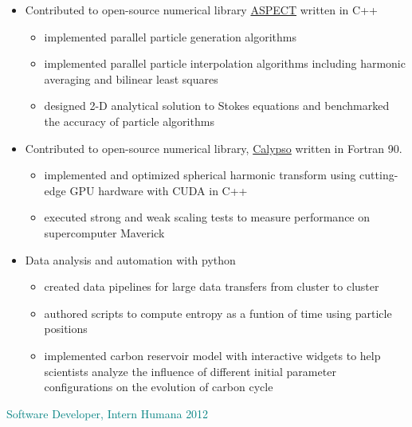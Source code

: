 \documentclass[11pt]{ltxdoc}
\begin{document}
      \begin{itemize}
      	
        \item Contributed to open-source numerical library \href{https://github.com/geodynamics/aspect}{ASPECT} written in C++
        
            \begin{itemize}        
            	\item implemented parallel particle generation algorithms
            	\item implemented parallel particle interpolation algorithms including harmonic averaging and bilinear least squares
            	\item designed 2-D analytical solution to Stokes equations and benchmarked the accuracy of particle algorithms
			\end{itemize}
      
		\item Contributed to open-source numerical library,
		\href{https://geodynamics.org/cig/software/calypso/}{Calypso} written in Fortran 90.
  
         	\begin{itemize}
          		\item implemented and optimized spherical harmonic transform using cutting-edge GPU hardware with CUDA in C++
          		\item executed strong and weak scaling tests to measure performance on supercomputer Maverick
          	\end{itemize}
        \item Data analysis and automation with python
        	\begin{itemize}
        		\item created data pipelines for large data transfers from cluster to cluster
        		\item authored scripts to compute entropy as a funtion of time using particle positions 
        		\item implemented carbon reservoir model with interactive widgets to help scientists analyze the influence of different initial parameter configurations on the evolution of carbon cycle 
        	\end{itemize}            
	\end{itemize}
    
	\textcolor{teal}{Software Developer, Intern} \hfill \textcolor{teal}{Humana} \hfill \textcolor{teal}{2012}
		
\end{document}
